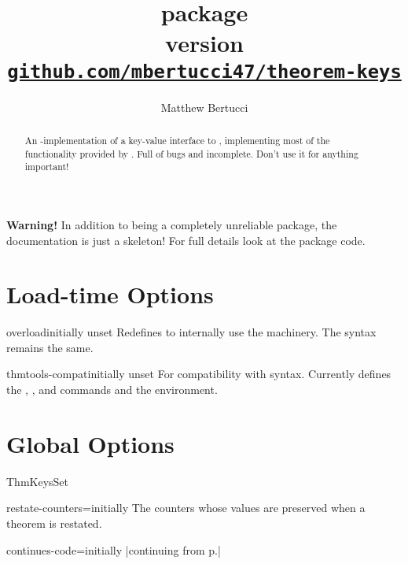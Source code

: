 \documentclass{ltxdoc}
\title{
	\pkg{theorem-keys} package \\[1ex]
	\large version \version \\[1ex]
	\href{https://github.com/mbertucci47/theorem-keys}
	  {\texttt{github.com/mbertucci47/theorem-keys}}
	}
\author{Matthew Bertucci}
\newcommand{\ttbrackets}[1]{\brackets{\texttt{#1}}}
\begin{document}
\maketitle

\begin{abstract}
An -implementation of a key-value interface to , implementing most of the functionality provided by . Full of bugs and incomplete. Don't use it for anything important!
\end{abstract}

\begin{tcolorbox}[colframe=red,colback=red!10!white]
\textbf{Warning!} In addition to being a completely unreliable package, the documentation is just a skeleton! For full details look at the package code.
\end{tcolorbox}

\section{Load-time Options}

\begin{docKey}{overload}{}{initially unset}
Redefines  to internally use the  machinery. The syntax remains the same.
\end{docKey}

\begin{docKey}{thmtools-compat}{}{initially unset}
For compatibility with  syntax. Currently defines the , , and  commands and the  environment. 
\end{docKey}

\section{Global Options}

\begin{docCommand}{ThmKeysSet}{}

\end{docCommand}

\begin{docKey}{restate-counters}{=}{initially \ttbrackets{equation}}
The counters whose values are preserved when a theorem is restated.
\end{docKey}

\begin{docKey}{continues-code}{=}{initially |continuing from p.\cs{,}\ttbrackets{\#1}|}

\end{docKey}
\end{document}
